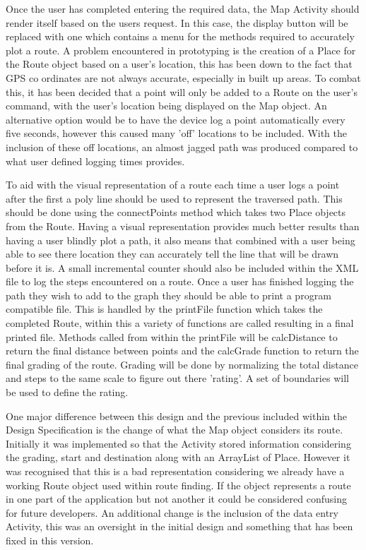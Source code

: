 Once the user has completed entering the required data, the Map Activity should render itself based on the users request. In this case, the display button will be replaced with one which contains a menu for the methods required to accurately plot a route. A problem encountered in prototyping is the creation of a Place for the Route object based on a user's location, this has been down to the fact that GPS co ordinates are not always accurate, especially in built up areas. To combat this, it has been decided that a point will only be added to a Route on the user's command, with the user's location being displayed on the Map object. An alternative option would be to have the device log a point automatically every five seconds, however this caused many 'off' locations to be included. With the inclusion of these off locations, an almost jagged path was produced compared to what user defined logging times provides. 

To aid with the visual representation of a route each time a user logs a point after the first a poly line should be used to represent the traversed path. This should be done using the connectPoints method which takes two Place objects from the Route. Having a visual representation provides much better results than having a user blindly plot a path, it also means that combined with a user being able to see there location they can accurately tell the line that will be drawn before it is. A small incremental counter should also be included within the XML file to log the steps encountered on a route. Once a user has finished logging the path they wish to add to the graph they should be able to print a program compatible file. This is handled by the printFile function which takes the completed Route, within this a variety of functions are called resulting in a final printed file. Methods called from within the printFile will be calcDistance to return the final distance between points and the calcGrade function to return the final grading of the route. Grading will be done by normalizing the total distance and steps to the same scale to figure out there 'rating'. A set of boundaries will be used to define the rating.

One major difference between this design and the previous included within the Design Specification is the change of what the Map object considers its route. Initially it was implemented so that the Activity stored information considering the grading, start and destination along with an ArrayList of Place. However it was recognised that this is a bad representation considering we already have a working Route object used within route finding. If the object represents a route in one part of the application but not another it could be considered confusing for future developers. An additional change is the inclusion of the data entry Activity, this was an oversight in the initial design and something that has been fixed in this version. 

